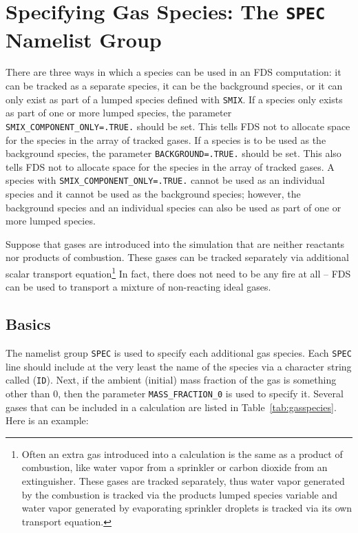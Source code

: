 \documentclass[11pt]{book}
\newcommand{\ct}{\tt\small}
\begin{document}
\section{Specifying Gas Species: The \texorpdfstring{{\tt SPEC}}{SPEC} Namelist Group}
\label{info:SPEC}

There are three ways in which a species can be used in an FDS computation: it can be tracked as a separate species,
it can be the background species, or it can only exist as part of a lumped species defined with {\ct SMIX}.
If a species only exists as part of one or more lumped species, the parameter {\ct SMIX\_COMPONENT\_ONLY=.TRUE.} should be set.
This tells FDS not to allocate space for the species in the array of tracked gases.
If a species is to be used as the background species, the parameter {\ct BACKGROUND=.TRUE.} should be set.
This also tells FDS not to allocate space for the species in the array of tracked gases. A species with {\ct SMIX\_COMPONENT\_ONLY=.TRUE.}
cannot be used as an individual species and it cannot be used as the background species; however, the background species and an individual species
can also be used as part of one or more lumped species.


Suppose that gases are introduced into the simulation
that are neither reactants nor products of combustion.
These gases can be tracked separately via additional scalar transport equation\footnote{
Often an extra gas introduced into a calculation is the same as a
product of combustion, like water vapor from a sprinkler or carbon
dioxide from an extinguisher. These gases are tracked separately,
thus water vapor generated by the combustion is tracked via the
products lumped species variable and water vapor generated by evaporating
sprinkler droplets is tracked via its own transport equation.}
In fact, there does not need to be any fire
at all -- FDS can be used to transport a mixture of non-reacting
ideal gases.

\subsection{Basics}

\label{info:SPEC_Basics}

The namelist group {\ct SPEC} is used to specify each additional
gas species. Each {\ct SPEC} line should include at the very least
the name of the species via a character string called ({\ct ID}).
Next, if the ambient (initial) mass fraction of the gas is something
other than 0, then the parameter {\ct MASS\_FRACTION\_0} is used to
specify it. Several gases that can be included in a calculation are listed in
Table~\ref{tab:gasspecies}. Here is an example:
\end{document}
